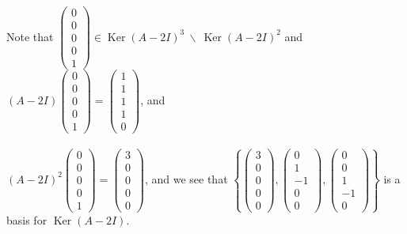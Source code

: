 \documentclass[12pt]{article}
\DeclareMathOperator{\Ker}{Ker}
\begin{document}
\noindent Note that $\begin{pmatrix}
    0 \\
    0 \\
    0 \\
    0 \\
    1
\end{pmatrix} \in \Ker(A - 2I)^3 \ \backslash \ \Ker(A - 2I)^2$ and $(A - 2I)\begin{pmatrix}
    0 \\
    0 \\
    0 \\
    0 \\
    1
\end{pmatrix} = \begin{pmatrix}
    1 \\
    1 \\
    1 \\
    1 \\
    0
\end{pmatrix}$, and \\
\\

\noindent $(A - 2I)^2\begin{pmatrix}
    0 \\
    0 \\
    0 \\
    0 \\
    1
\end{pmatrix} = \begin{pmatrix}
    3 \\
    0 \\
    0 \\
    0 \\
    0
\end{pmatrix}$, and we see that $\left\{ \begin{pmatrix}
    3 \\
    0 \\
    0 \\
    0 \\
    0
\end{pmatrix}, \begin{pmatrix}
    0 \\
    1 \\
    -1 \\
    0 \\
    0
\end{pmatrix}, \begin{pmatrix}
    0 \\
    0 \\
    1 \\
    -1 \\
    0
\end{pmatrix}\right\}$ is a basis for $\Ker(A - 2I)$. \\
\end{document}

